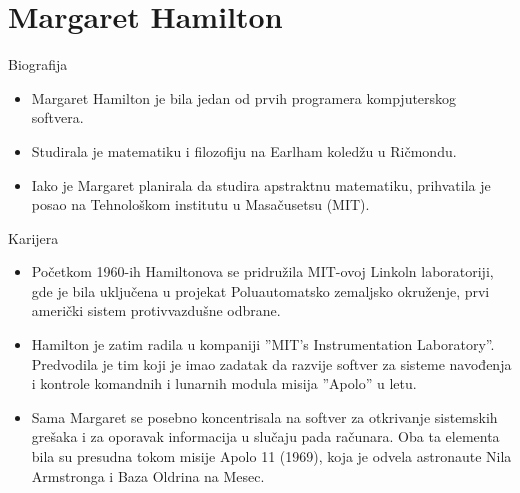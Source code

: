 \documentclass[aspectratio=169]{beamer}
\begin{document}
\section{Margaret Hamilton}
\begin{frame}{Biografija}

    \begin{itemize}
        \item<1-> Margaret Hamilton je bila jedan od prvih programera kompjuterskog softvera.
        
        \item<2-> Studirala je matematiku i filozofiju na Earlham koledžu u Ričmondu.
        
        \item<3->Iako je Margaret planirala da studira apstraktnu matematiku, prihvatila je posao na Tehnološkom institutu u Masačusetsu (MIT).
    \end{itemize}


\end{frame}
\begin{frame}{Karijera}

    \begin{itemize}
        \item<1-> Početkom 1960-ih Hamiltonova se pridružila MIT-ovoj Linkoln laboratoriji, gde je bila uključena u projekat Poluautomatsko zemaljsko okruženje, prvi američki sistem protivvazdušne odbrane.
        
        \item<2->Hamilton je zatim radila u kompaniji ''MIT’s Instrumentation Laboratory''. Predvodila je tim koji je imao zadatak da razvije softver za sisteme navođenja i kontrole komandnih i lunarnih modula misija ''Apolo'' u letu.
        
        \item<3-> Sama Margaret se posebno koncentrisala na softver za otkrivanje sistemskih grešaka i za oporavak informacija u slučaju pada računara. Oba ta elementa bila su presudna tokom misije Apolo 11 (1969), koja je odvela astronaute Nila Armstronga i Baza Oldrina na Mesec.
    \end{itemize}


\end{frame}
\end{document}
